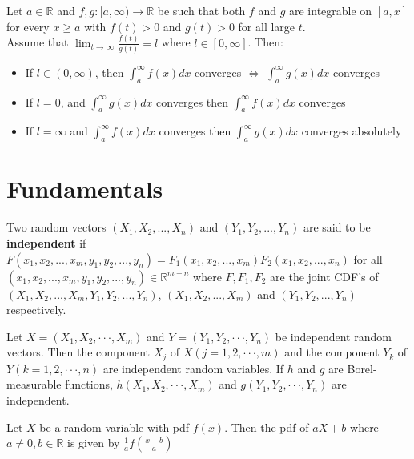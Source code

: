 \begin{prop}
    Let $a \in \mathbb{R}$ and $f,g: [a, \infty) \to \mathbb{R}$ be such that both $f$ and $g$ are integrable on $[a,x]$ for every $x \geq a$ with $f(t) > 0$ and $g(t) > 0$ for all large $t$. \\ Assume that
    $\displaystyle \lim_{t \to \infty} \frac{f(t)}{g(t)} = l$ where $l \in [0, \infty]$. Then:
    \begin{itemize}
        \item If $l \in (0, \infty)$, then $\int_a^\infty f(x)dx$ converges $\iff$ $\int_a^\infty g(x)dx$ converges
        \item If $l = 0$, and $\int_a^\infty g(x)dx$ converges then $\int_a^\infty f(x)dx$ converges
        \item If $l = \infty$ and $\int_a^\infty f(x)dx$ converges then $\int_a^\infty g(x)dx$ converges absolutely
    \end{itemize}
\end{prop}

\section{Fundamentals}

\begin{defn}
    Two random vectors $(X_1, X_2, ... , X_n)$ and $(Y_1, Y_2, ... , Y_n)$ are said to be \textbf{independent} if $F(x_1, x_2, ..., x_m, y_1, y_2, ..., y_n) = F_1 (x_1, x_2, ..., x_m) F_2 (x_1, x_2, ..., x_n)$ for all $(x_1, x_2, ..., x_m, y_1, y_2, ..., y_n) \in \mathbb{R}^{m+n}$ where $F, F_1, F_2$ are the joint CDF's of $(X_1, X_2, ..., X_m, Y_1, Y_2, ..., Y_n)$, $(X_1, X_2, ..., X_m)$ and $(Y_1, Y_2, ..., Y_n)$ respectively.
\end{defn}

\begin{thm}
    Let $X = (X_1, X_2, · · · , X_m)$ and $Y = (Y_1, Y_2, · · · , Y_n)$ be independent random vectors. Then the component $X_j$ of $X(j = 1, 2, · · · , m)$ and the component $Y_k$ of $Y(k = 1, 2, · · · , n)$ are independent random variables. If $h$ and $g$ are Borel-measurable functions, $h(X_1, X_2, · · · , X_m)$ and $g(Y_1, Y_2, · · · , Y_n)$ are independent.
\end{thm}

\begin{thm}
    Let $X$ be a random variable with pdf $f(x)$. Then the pdf of $aX+b$ where $a \neq 0, b \in \mathbb{R}$ is given by $\displaystyle \frac{1}{a} f \left (\frac{x-b}{a} \right)$
\end{thm}

